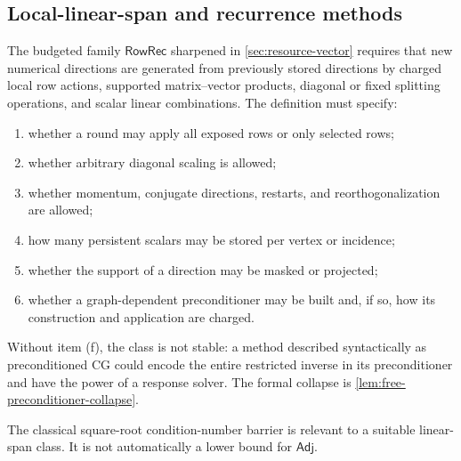 \subsection{Local-linear-span and recurrence methods}

The budgeted family $\mathsf{RowRec}$ sharpened in
\cref{sec:resource-vector} requires that new numerical directions are
generated from previously stored directions by charged local
row actions, supported matrix--vector products, diagonal or fixed splitting
operations, and scalar linear combinations.  The definition must specify:

\begin{enumerate}[label=(\alph*)]
\item whether a round may apply all exposed rows or only selected rows;
\item whether arbitrary diagonal scaling is allowed;
\item whether momentum, conjugate directions, restarts, and reorthogonalization
      are allowed;
\item how many persistent scalars may be stored per vertex or incidence;
\item whether the support of a direction may be masked or projected;
\item whether a graph-dependent preconditioner may be built and, if so, how
      its construction and application are charged.
\end{enumerate}

Without item (f), the class is not stable: a method described syntactically as
preconditioned CG could encode the entire restricted inverse in its
preconditioner and have the power of a response solver.  The formal collapse
is \cref{lem:free-preconditioner-collapse}.

The classical square-root condition-number barrier is relevant to a suitable
linear-span class.  It is not automatically a lower bound for
$\mathsf{Adj}$.

